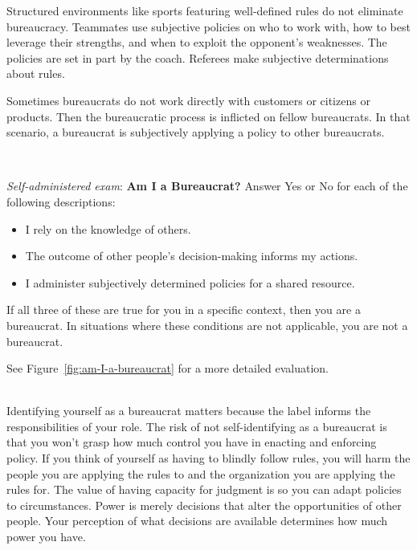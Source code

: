 Structured environments like sports featuring well-defined rules do not eliminate bureaucracy. Teammates use subjective policies on who to work with, how to best leverage their strengths, and when to exploit the opponent's weaknesses. The policies are set in part by the coach. Referees make subjective determinations about rules.

Sometimes bureaucrats do not work directly with customers or citizens or products. Then the bureaucratic process is inflicted on fellow bureaucrats. In that scenario, a bureaucrat is subjectively applying a policy to other bureaucrats. 

\ \\


\begin{quizbox}{
      \textit{Self-administered exam}: 
      \textbf{Am I a Bureaucrat?}
}
Answer Yes or No for each of the following descriptions:
\begin{itemize}
    \item I rely on the knowledge of others. 
    \item The outcome of other people's decision-making informs my actions. 
    \item I administer subjectively determined policies for a shared resource. 
\end{itemize}
If all three of these are true for you in a specific context, then you are a bureaucrat. In situations where these conditions are not applicable, you are not a bureaucrat.
\label{box:self-administered-exam}
\end{quizbox} 
See Figure~\ref{fig:am-I-a-bureaucrat} \iftoggle{haspagenumbers}{ on page~\pageref{fig:am-I-a-bureaucrat}}{}
for a more detailed evaluation.

\ \\

Identifying yourself as a bureaucrat matters because the label informs the responsibilities of your role. The risk of not self-identifying as a bureaucrat is that you won't grasp how much control you have in enacting and enforcing policy. If you think of yourself as having to blindly follow rules, you will harm the people you are applying the rules to and the organization you are applying the rules for. The value of having capacity for judgment is so you can adapt policies to circumstances. Power is merely decisions that alter the opportunities of other people.
Your perception of what decisions are available determines how much power you have.

